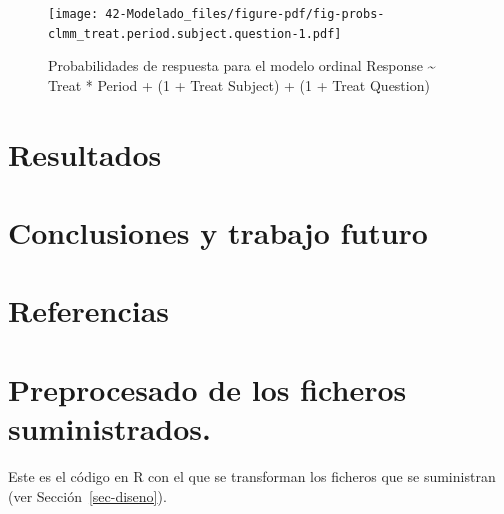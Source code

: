 \documentclass[
  12pt,
  a4paper,
  extrafontsizes,
  onecolumn,
  openright]{memoir}
\begin{document}
\begin{figure}[h]

{\centering \texttt{[image: 42-Modelado\_files/figure-pdf/fig-probs-clmm\_treat.period.subject.question-1.pdf]}

}

\caption{\label{fig-probs-clmm_treat.period.subject.question}Probabilidades
de respuesta para el modelo ordinal Response \textasciitilde{} Treat *
Period + (1 + Treat \textbar{} Subject) + (1 + Treat \textbar{}
Question)}

\end{figure}


\hypertarget{resultados}{%
\chapter{Resultados}\label{resultados}}


\hypertarget{conclusiones}{%
\chapter{Conclusiones y trabajo futuro}\label{conclusiones}}


\hypertarget{referencias}{%
\chapter*{Referencias}\label{referencias}}


\printbibliography[heading=none]

\cleardoublepage
{}
{}
\appendix

\hypertarget{sec-preprocess}{%
\chapter{Preprocesado de los ficheros
suministrados.}\label{sec-preprocess}}

Este es el código en R con el que se transforman los ficheros que se
suministran (ver Sección~\ref{sec-diseno}).

\footnotesize
\end{document}

